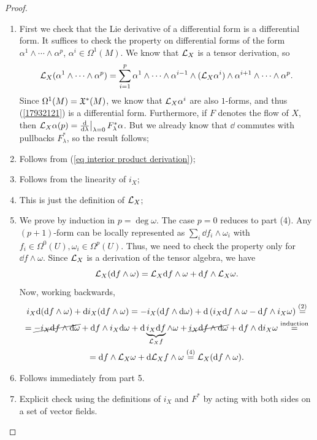 \begin{proof}
\begin{enumerate}
    \item First we check that the Lie derivative of a differential form is a differential form. It suffices to check the property on differential forms of the form $\alpha^1\wedge\cdots\wedge\alpha^p$, $\alpha^i\in\Omega^1(M)$. We know that $\mathcal{L}_X$ is a tensor derivation, so 
    \[\mathcal{L}_X (\alpha^1\wedge\cdots\wedge\alpha^p)=\sum_{i=1}^p \alpha^1\wedge\cdots\wedge\alpha^{i-1}\wedge(\mathcal{L}_X\alpha^i)\wedge\alpha^{i+1}\wedge\cdots\wedge\alpha^p.\label{17932121}\]
    Since $\Omega^1(M)=\mathfrak{X}^\ast(M)$, we know that $\mathcal{L}_X \alpha^i$ are also $1$-forms, and thus (\ref{17932121}) is a differential form.
    Furthermore, if $F$ denotes the flow of $X$, then $\Lie_X\alpha (p)=\restr{\frac{\dd}{\dd\lambda}}{\lambda=0}F^\ast_\lambda \alpha$. But we already know that $\dd$ commutes with pullbacks $F^\ast_\lambda$, so the result follows;
    \item Follows from (\ref{eq interior product derivation});
    \item Follows from the linearity of $i_X$;
    \item This is just the definition of $\mathcal{L}_X$;
    \item We prove by induction in $p=\deg\omega$. The case $p=0$ reduces to part (4). Any $(p+1)$-form can be locally represented as $\sum_i \dd f_i\wedge \omega_i$ with $f_i\in\Omega^0(U), \omega_i\in \Omega^p(U)$. Thus, we need to check the property only for $\dd f\wedge \omega$. Since $\mathcal{L}_X$ is a derivation of the tensor algebra, we have
    \[\mathcal{L}_X({\mathrm{d}} f\wedge\omega)=\mathcal{L}_X {\mathrm{d}} f\wedge \omega+{\mathrm{d}} f\wedge \mathcal{L}_X\omega.\]
    Now, working backwards,
    \begin{multline}
        i_X{\mathrm{d}} ({\mathrm{d}} f\wedge \omega)+ {\mathrm{d}} i_X ({\mathrm{d}} f\wedge\omega)=-i_X({\mathrm{d}} f\wedge{\mathrm{d}} \omega)+{\mathrm{d}}\left(i_X{\mathrm{d}} f\wedge\omega-{\mathrm{d}} f\wedge i_X\omega\right)\overset{(2)}{=}
        \\
        =\cancel{-i_X{\mathrm{d}} f\wedge{\mathrm{d}} \omega}+{\mathrm{d}} f\wedge i_X{\mathrm{d}}\omega +{\mathrm{d}} \underbrace{i_X {\mathrm{d}} f}_{\mathcal{L}_X f}\wedge\omega+\cancel{i_X{\mathrm{d}} f\wedge{\mathrm{d}} \omega}+{\mathrm{d}} f\wedge {\mathrm{d}} i_X\omega\overset{\text{induction}}{=}
        \\
        ={\mathrm{d}} f\wedge \mathcal{L}_X\omega +{\mathrm{d}} \mathcal{L}_X f\wedge \omega\overset{(4)}{=}\mathcal{L}_X({\mathrm{d}} f\wedge\omega).
    \end{multline}
    \item Follows immediately from part 5.
    \item Explicit check using the definitions of $i_X$ and $F^\ast$ by acting with both sides on a set of vector fields.
\end{enumerate}
\end{proof}

